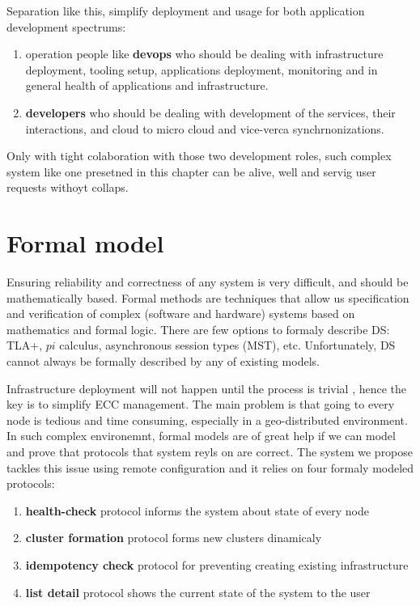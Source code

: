 Separation like this, simplify deployment and usage for both application development spectrums: 

\begin{enumerate}[start=1,label={(\bfseries \roman*)}]
	\item operation people like \textbf{devops} who should be dealing with infrastructure deployment, tooling setup, applications deployment, monitoring and in general health of applications and infrastructure.
	\item \textbf{developers} who should be dealing with development of the services, their interactions, and cloud to micro cloud and vice-verca synchrnonizations.
\end{enumerate}

Only with tight colaboration with those two development roles, such complex system like one presetned in this chapter can be alive, well and servig user requests withoyt collaps.
%
%
\section{Formal model}\label{sec:formal_model}
%
Ensuring reliability and correctness of any system is very difficult, and should be mathematically based. Formal methods are techniques that allow us specification and verification of complex (software and hardware) systems based on mathematics and formal logic. There are few options to formaly describe DS: TLA+, $pi$ calculus, asynchronous session types (MST), etc. Unfortunately, DS cannot always be formally described by any of existing models.

Infrastructure deployment will not happen until the process is trivial \cite{SatyanarayananBCD09}, hence the key is to simplify ECC management. The main problem is that going to every node is tedious and time consuming, especially in a geo-distributed environment. In such complex environemnt, formal models are of great help if we can model and prove that protocols that system reyls on are correct. The system we propose tackles this issue using remote configuration and it relies on four formaly modeled protocols: 

\begin{enumerate}[start=1,label={(\bfseries \arabic*)}]
	\item \textbf{health-check} protocol informs the system about state of every node 
	\item \textbf{cluster formation} protocol forms new clusters dinamicaly
	\item \textbf{idempotency check} protocol for preventing creating existing infrastructure
	\item \textbf{list detail} protocol shows the current state of the system to the user
\end{enumerate}

